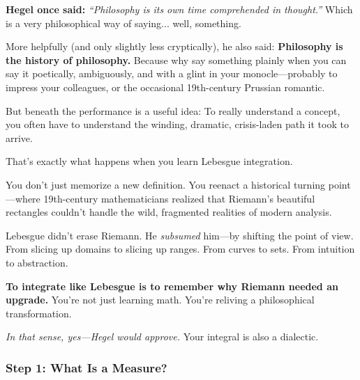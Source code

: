 \begin{tcolorbox}[title={\textbf{Historical Sidebar: Hegel, Lebesgue, and the Self-Conscious Integral}}, colback=gray!5, colframe=black, fonttitle=\bfseries, arc=1.5mm, boxrule=0.4pt]

    \textbf{Hegel once said:}  \textit{“Philosophy is its own time comprehended in thought.”} Which is a very philosophical way of saying... well, something.

    \medskip
    
    More helpfully (and only slightly less cryptically), he also said:  \textbf{Philosophy is the history of philosophy.} Because why say something plainly when you can say it poetically, ambiguously, and with a glint in your monocle—probably to impress your colleagues, or the occasional 19th-century Prussian romantic.

    \medskip
    
    But beneath the performance is a useful idea:  To really understand a concept, you often have to understand the winding, dramatic, crisis-laden path it took to arrive.
    
    \medskip
    
    That’s exactly what happens when you learn Lebesgue integration.

    \medskip
    
    You don’t just memorize a new definition. You reenact a historical turning point—where 19th-century mathematicians realized that Riemann’s beautiful rectangles couldn't handle the wild, fragmented realities of modern analysis.

    \medskip
    
    Lebesgue didn’t erase Riemann.  He \textit{subsumed} him—by shifting the point of view.  From slicing up domains to slicing up ranges. From curves to sets. From intuition to abstraction.

    \medskip
    
    \textbf{To integrate like Lebesgue is to remember why Riemann needed an upgrade.}  You’re not just learning math. You’re reliving a philosophical transformation.

    \medskip
    
    \textit{In that sense, yes—Hegel would approve.} Your integral is also a dialectic.
    
\end{tcolorbox}



\subsubsection{Step 1: What Is a Measure?}

